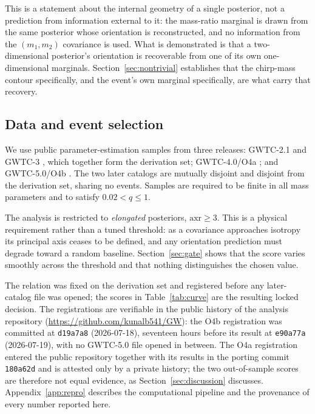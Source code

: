 \documentclass[aps,prd,twocolumn,amsmath,amssymb,nofootinbib,superscriptaddress]{revtex4-2}
\begin{document}
This is a statement about the internal geometry of a single posterior, not a prediction from information
external to it: the mass-ratio marginal is drawn from the same posterior whose orientation is
reconstructed, and no information from the $(m_1,m_2)$ covariance is used. What is demonstrated is that a
two-dimensional posterior's orientation is recoverable from one of its own one-dimensional marginals.
Section~\ref{sec:nontrivial} establishes that the chirp-mass contour specifically, and the event's own
marginal specifically, are what carry that recovery.

\subsection{Data and event selection}
\label{sec:data}
We use public parameter-estimation samples from three releases: GWTC-2.1 \citep{GWTC21} and GWTC-3
\citep{GWTC3}, which together form the derivation set; GWTC-4.0/O4a \citep{GWTC4}; and GWTC-5.0/O4b
\citep{GWTC5}. The two later catalogs are mutually disjoint and disjoint from the derivation set, sharing
no events. Samples are required to be finite in all mass parameters and to satisfy $0.02 < q \le 1$.

The analysis is restricted to \emph{elongated} posteriors, $\mathrm{axr}\ge 3$. This is a physical
requirement rather than a tuned threshold: as a covariance approaches isotropy its principal axis ceases to
be defined, and any orientation prediction must degrade toward a random baseline. Section~\ref{sec:gate}
shows that the score varies smoothly across the threshold and that nothing distinguishes the chosen value.

The relation was fixed on the derivation set and registered before any later-catalog file was opened; the
scores in Table~\ref{tab:curve} are the resulting locked decision. The registrations are verifiable in
the public history of the analysis repository (\url{https://github.com/kunalb541/GW}): the O4b
registration was committed at \texttt{d19a7a8} (2026-07-18), seventeen hours before its result at
\texttt{e90a77a} (2026-07-19), with no GWTC-5.0 file opened in between. The O4a registration entered the
public repository together with its results in the porting commit \texttt{180a62d} and is attested only
by a private history; the two out-of-sample scores are therefore not equal evidence, as
Section~\ref{sec:discussion} discusses. Appendix~\ref{app:repro} describes the
computational pipeline and the provenance of every number reported here.
\end{document}
